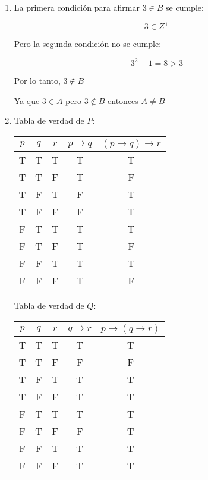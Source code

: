 \documentclass[10pt]{report}
\begin{document}
\begin{enumerate}
	\item La primera condición para afirmar $3 \in B$ se cumple:
	
	\[ 3 \in Z^{+} \]
	
	Pero la segunda condición no se cumple:  
	
	\[ 3^{2}-1 = 8 > 3\]
	
	Por lo tanto, $3 \notin B$
	
	Ya que $3\in A$ pero $3\notin B$ entonces $A \neq B$
	\item Tabla de verdad de $P$:
	
	    \begin{center}
            \begin{tabular}{ |c|c|c|c|c| } 
             \hline 
             $p$ & $q$ & $r$ & $p \rightarrow q$ & $(p \rightarrow q) \rightarrow r$ \\  [0.5ex] 
                \hline
             T & T & T & T & T\\ 
             T & T & F & T & F\\ 
             T & F & T & F & T\\ 
             T & F & F & F & T\\ 
             F & T & T & T & T\\ 
             F & T & F & T & F\\ 
             F & F & T & T & T\\ 
             F & F & F & T & F\\ 
             \hline
            \end{tabular}
        \end{center}
        
         Tabla de verdad de $Q$:
         
         \begin{center}
            \begin{tabular}{ |c|c|c|c|c| } 
             \hline 
             $p$ & $q$ & $r$ & $q \rightarrow r$ & $p \rightarrow (q \rightarrow r)$ \\  [0.5ex] 
                \hline
             T & T & T & T & T\\ 
             T & T & F & F & F\\ 
             T & F & T & T & T\\ 
             T & F & F & T & T\\ 
             F & T & T & T & T\\ 
             F & T & F & F & T\\ 
             F & F & T & T & T\\ 
             F & F & F & T & T\\ 
             \hline
            \end{tabular}
        \end{center}
        

\end{enumerate}
\end{document}
